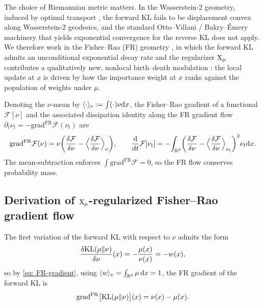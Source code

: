 \documentclass{article}
\begin{document}
The choice of Riemannian metric matters. In the Wasserstein-2 geometry, induced by optimal transport \citep{jordan1998variational,otto2001geometry}, the forward KL fails to be displacement convex along Wasserstein-2 geodesics, and the standard Otto--Villani / Bakry--{\'E}mery machinery \citep{otto2000generalization,bakry2014analysis} that yields exponential convergence for the reverse KL does not apply. We therefore work in the Fisher--Rao (FR) geometry \citep{amari2016information,bauer2016uniqueness}, in which the forward KL admits an unconditional exponential decay rate and the regularizer $\mathrm{X}_\mu$ contributes a qualitatively new, nonlocal birth--death modulation \citep{lu2019accelerating}: the local update at $x$ is driven by how the importance weight at $x$ ranks against the population of weights under $\mu$.

Denoting the $\nu$-mean by $\langle \cdot \rangle_\nu := \int( \cdot ) \nu \mathrm{d} x$, the Fisher--Rao gradient of a functional $\mathcal F[\nu]$ and the associated dissipation identity along the FR gradient flow $\partial_t\nu_t = -\mathrm{grad}^{\mathrm{FR}}\mathcal F(\nu_t)$ are
\begin{equation}
    \mathrm{grad}^{\mathrm{FR}}\mathcal F(\nu) = \nu\biggl(\frac{\delta\mathcal F}{\delta\nu} - \Big\langle\frac{\delta\mathcal F}{\delta\nu}\Big\rangle_\nu\biggr),
    \qquad
    \frac{\mathrm{d}}{\mathrm{d} t}\mathcal F[\nu_t] = -\!\int_{\mathbb R^d}\biggl(\frac{\delta\mathcal F}{\delta\nu} - \Big\langle\frac{\delta\mathcal F}{\delta\nu}\Big\rangle_{\nu_t}\biggr)^{2}\nu_t \mathrm{d} x.
    \label{eq: FR-gradient}
\end{equation}
The mean-subtraction enforces $\int\mathrm{grad}^{\mathrm{FR}}\mathcal F = 0$, so the FR flow conserves probability mass.

\subsection{Derivation of $\mathrm{X}_\mu$-regularized Fisher--Rao gradient flow}
\label{subsec: FR-grad-calc}

The first variation of the forward KL with respect to $\nu$ admits the form
\begin{equation}
    \frac{\delta \mathrm{KL}(\mu\|\nu)}{\delta \nu}(x) = -\frac{\mu(x)}{\nu(x)} = -w(x),
    \label{eq: var-KL}
\end{equation}
so by \eqref{eq: FR-gradient}, using $\langle w \rangle_\nu = \int_{\mathbb R^d} \mu \,\mathrm{d} x = 1$, the FR gradient of the forward KL is
\begin{equation}
    \mathrm{grad}^{\mathrm{FR}}\big[\mathrm{KL}(\mu\|\nu)\big](x) = \nu(x) - \mu(x).
    \label{eq: FR-grad-KL}
\end{equation}
\end{document}
